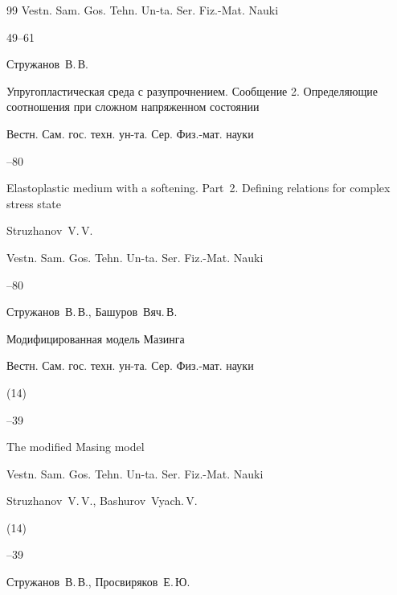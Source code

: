 \begin{thebibliography}{99}
\jour  Vestn. Sam. Gos. Tehn. Un-ta. Ser. Fiz.-Mat. Nauki



\pages \mbox{49--61}






\by Стружанов~В.\,В.

\paper Упругопластическая среда с разупрочнением. Сообщение 2. Определяющие соотношения при сложном напряженном состоянии

\jour  Вестн. Сам. гос. техн. ун-та. Сер. Физ.-мат. науки



--80

\misctransl 

\paper Elastoplastic medium with a softening. Part~2. Defining relations for complex stress state

\by Struzhanov~V.\,V.

\jour  Vestn. Sam. Gos. Tehn. Un-ta. Ser. Fiz.-Mat. Nauki



--80




\by Стружанов~В.\,В., Башуров~Вяч.\,В.

\paper Модифицированная модель Мазинга

\jour  Вестн. Сам. гос. техн. ун-та. Сер. Физ.-мат. науки


(14)

--39

\misctransl

\paper The modified Masing model

\jour  Vestn. Sam. Gos. Tehn. Un-ta. Ser. Fiz.-Mat. Nauki

\by Struzhanov~V.\,V., Bashurov~Vyach.\,V.


(14)

--39








\by Стружанов~В.\,В., Просвиряков~Е.\,Ю.


\end{thebibliography}
